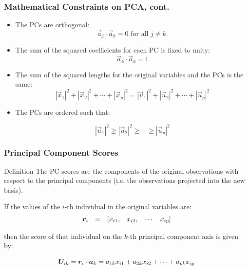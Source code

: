 \documentclass{beamer}
\begin{document}
\begin{frame}
  \frametitle{Mathematical Constraints on PCA, cont.}

\begin{itemize}
  \item The PCs are orthogonal:
\[
\vec{a}_j \cdot \vec{a}_k = 0 \mbox{ for all } j \neq k.
\]


	\item The sum of the squared coefficients for each PC is fixed to unity:
\[
\vec{a}_k \cdot \vec{a}_k = 1
\]

	\item The sum of the squared lengths for the original variables and the PCs is the same:
\[
|\vec{x}_1|^2 + |\vec{x}_2|^2 + \cdots + |\vec{x}_p|^2 = |\vec{u}_1|^2 + |\vec{u}_2|^2 + \cdots + |\vec{u}_p|^2
\]	


	\item The PCs are ordered such that:

\[
 |\vec{u}_1|^2 \geq |\vec{u}_2|^2  \geq \cdots \geq |\vec{u}_p|^2
\]

\end{itemize}

\end{frame}



\begin{frame}
  \frametitle{Principal Component Scores}

\begin{block}{Definition}
The PC scores are the components of the original observations with respect to the principal components (i.e. the observations projected into the new basis).
\end{block}
\medskip

If the values of the $i$-th individual in the original variables are:
\[
\begin{array}{cccccc}
\bm{r}_i & = & [x_{i1}, & x_{i2}, & \cdots & x_{ip}]
\end{array}
\]

then the score of that individual on the $k$-th principal component axis is given by:

\[
\bm{U}_{ik} = \bm{r}_i \cdot \bm{a}_k = a_{1k}x_{i1} + a_{2k}x_{i2} + \cdots + a_{pk}x_{ip}
\]

\end{frame}
\end{document}
